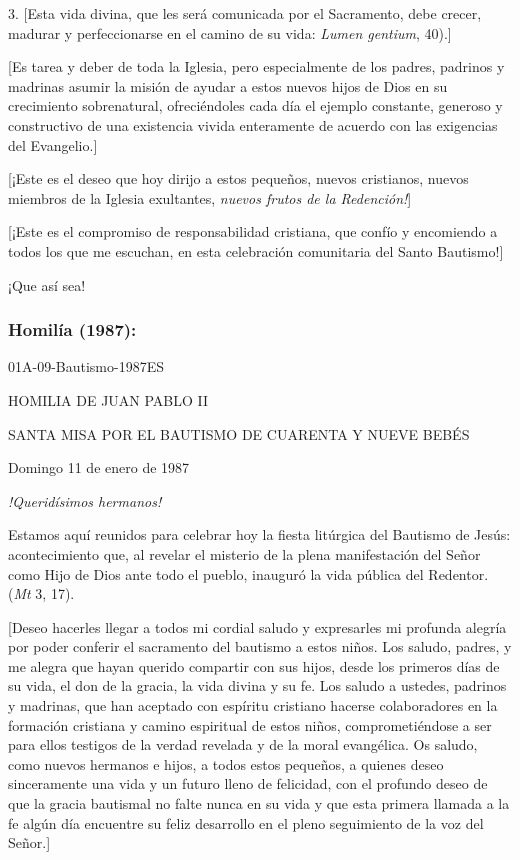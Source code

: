 \begin{body}
	3. {[}Esta vida divina, que les será comunicada por el Sacramento, debe crecer, madurar y perfeccionarse en el camino de su vida:  \emph{Lumen gentium}, 40).{]}

	{[}Es tarea y deber de toda la Iglesia, pero especialmente de los padres, padrinos y madrinas asumir la misión de ayudar a estos nuevos hijos de Dios en su crecimiento sobrenatural, ofreciéndoles cada día el ejemplo constante, generoso y constructivo de una existencia vivida enteramente de acuerdo con las exigencias del Evangelio.{]}

	{[}¡Este es el deseo que hoy dirijo a estos pequeños, nuevos cristianos, nuevos miembros de la Iglesia exultantes, \emph{nuevos frutos de la Redención!}{]}

	{[}¡Este es el compromiso de responsabilidad cristiana, que confío y encomiendo a todos los que me escuchan, en esta celebración comunitaria del Santo Bautismo!{]}

	¡Que así sea!

	\subsubsection{Homilía (1987):} 01A-09-Bautismo-1987ES

	HOMILIA DE JUAN PABLO II

	SANTA MISA POR EL BAUTISMO DE CUARENTA Y NUEVE BEBÉS

	Domingo 11 de enero de 1987

	\emph{!Queridísimos hermanos!}

	Estamos aquí reunidos para celebrar hoy la fiesta litúrgica del Bautismo de Jesús: acontecimiento que, al revelar el misterio de la plena manifestación del Señor como Hijo de Dios ante todo el pueblo, inauguró la vida pública del Redentor.  (\emph{Mt} 3, 17).

	{[}Deseo hacerles llegar a todos mi cordial saludo y expresarles mi profunda alegría por poder conferir el sacramento del bautismo a estos niños. Los saludo, padres, y me alegra que hayan querido compartir con sus hijos, desde los primeros días de su vida, el don de la gracia, la vida divina y su fe. Los saludo a ustedes, padrinos y madrinas, que han aceptado con espíritu cristiano hacerse colaboradores en la formación cristiana y camino espiritual de estos niños, comprometiéndose a ser para ellos testigos de la verdad revelada y de la moral evangélica. Os saludo, como nuevos hermanos e hijos, a todos estos pequeños, a quienes deseo sinceramente una vida y un futuro lleno de felicidad, con el profundo deseo de que la gracia bautismal no falte nunca en su vida y que esta primera llamada a la fe algún día encuentre su feliz desarrollo en el pleno seguimiento de la voz del Señor.{]}


\end{body}
